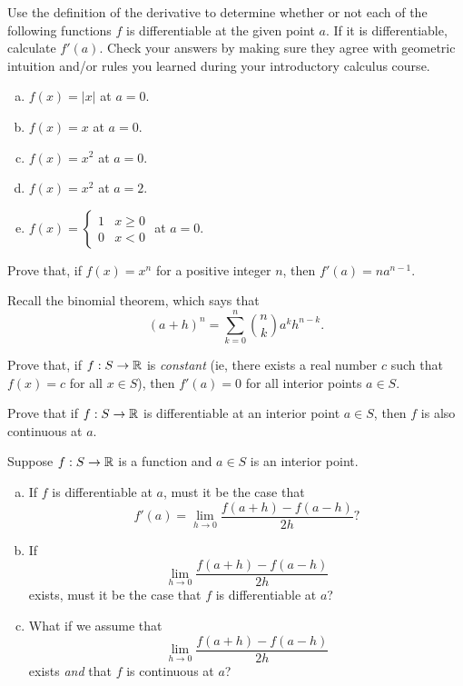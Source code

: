 \begin{exercise}
	Use the definition of the derivative to determine whether or not each of the following functions $f$ is differentiable at the given point $a$. If it is differentiable, calculate $f'(a)$. Check your answers by making sure they agree with geometric intuition and/or rules you learned during your introductory calculus course. 
	\begin{enumerate}[(a)]
		\item $f(x) = |x|$ at $a = 0$.
		\item $f(x) = x$ at $a = 0$. 
		\item $f(x) = x^2$ at $a = 0$. 
		\item $f(x) = x^2$ at $a = 2$. 
		\item $f(x) = \begin{cases} 1 & x \geq 0 \\ 0 & x < 0 \end{cases}$ at $a = 0$. 
	\end{enumerate}
\end{exercise}

\begin{exercise} \label{power-rule-positive} 
	Prove that, if $f(x) = x^n$ for a positive integer $n$, then $f'(a) = na^{n-1}$. \begin{hint} Recall the binomial theorem, which says that
	\[ (a+h)^n = \sum_{k = 0}^n \binom{n}{k} a^k h^{n-k}. \]
	\end{hint}
\end{exercise}

\begin{exercise} \label{constant-implies-derivative-zero-single}
	Prove that, if $f : S \to \mathbb{R}$ is \emph{constant} (ie, there exists a real number $c$ such that $f(x) = c$ for all $x \in S$), then $f'(a) = 0$ for all interior points $a \in S$. 
\end{exercise}

\begin{exercise} \label{differentiable-implies-continuous-single}
	Prove that if $f : S \to \mathbb{R}$ is differentiable at an interior point $a \in S$, then $f$ is also continuous at $a$. 
\end{exercise}

\begin{exercise}
	Suppose $f : S \to \mathbb{R}$ is a function and $a \in S$ is an interior point. 
	\begin{enumerate}[(a)]
		\item If $f$ is differentiable at $a$, must it be the case that
		\[ f'(a) = \lim_{h \to 0} \frac{f(a+h)-f(a-h)}{2h} ? \]
		\item If 
		\[ \lim_{h \to 0} \frac{f(a+h)-f(a-h)}{2h} \]
		exists, must it be the case that $f$ is differentiable at $a$?
		\item What if we assume that 
		\[ \lim_{h \to 0} \frac{f(a+h)-f(a-h)}{2h} \]
		exists \emph{and} that $f$ is continuous at $a$? 
	\end{enumerate}
\end{exercise}

